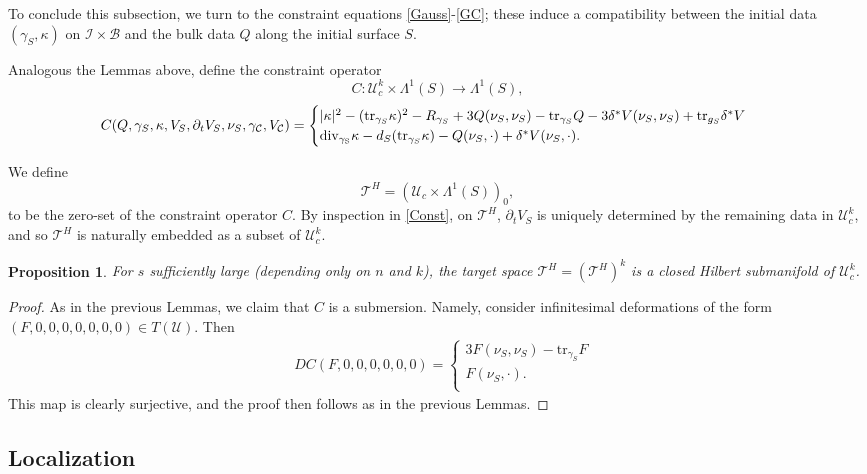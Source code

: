 \documentclass[10pt]{amsart}
\newcommand{\g}{\gamma}
\renewcommand{\d}{\delta}
\renewcommand{\k}{\kappa}
\newcommand{\cC}{{\mathcal C}}
\newcommand{\cT}{{\mathcal T}}
\newcommand{\cB}{{\mathcal B}}
\newcommand{\cU}{{\mathcal U}}
\newcommand{\cI}{\mathcal I}
\newcommand{\be}{\begin{equation}}
\newcommand{\ee}{\end{equation}}
\newcommand{\tr}{\mathrm{tr}}
\newcommand{\p}{\partial}
\renewcommand{\to}{\rightarrow}
\newcommand{\<}{\langle}
\renewcommand{\>}{\rangle}
\theoremstyle{plain}
\newtheorem{proposition}[lemma]{Proposition}
\theoremstyle{remark}
\theoremstyle{definition}
\numberwithin{equation}{section}
\begin{document}
  To conclude this subsection, we turn to the constraint equations \eqref{Gauss}-\eqref{GC}; these induce a compatibility between 
the initial data $(\g_S, \k)$ on $\cI \times \cB$ and the bulk data $Q$ along the initial surface $S$. 

  Analogous the Lemmas above, define the constraint operator 
 $$C: \cU_c^k \times \Lambda^1(S) \to \Lambda^1(S),$$
\be \label{Const}
\begin{split}
& C(Q, \g_S, \k, V_S, \p_t V_S, \nu_S, \g_{\cC}, V_{\cC}) = 
\begin{cases}
|\k|^2 - (\tr_{\g_S}\k)^2  - R_{\g_S} + 3Q(\nu_S,\nu_S) - \tr_{\g_S}Q - 3\d^*V(\nu_S, \nu_S) + \tr_{g_S}\d^*V\\
{\rm div_{\g_S}}  \k - d_S(\tr_{\g_S}\k) - Q(\nu_S, \cdot) + \d^*V(\nu_S, \cdot). \\
\end{cases}
\end{split}
\ee

  We define 
 \be \label{TH}
 \cT^H = (\cU_c \times \Lambda^1(S))_0,
 \ee
to be the zero-set of the constraint operator $C$. By inspection in \eqref{Const}, on $\cT^H$, $\p_t V_S$ is uniquely determined by the remaining 
data in $\cU_c^k$, and so $\cT^H$ is naturally embedded as a subset of $\cU_c^k$. 

\begin{proposition}\label{manifold}
For $s$ sufficiently large (depending only on $n$ and $k$), the target space $\cT^H = (\cT^H)^k$ is a closed Hilbert submanifold of $\cU_c^k$. 
\end{proposition}


\begin{proof} 
 As in the previous Lemmas, we claim that $C$ is a submersion. Namely, consider infinitesimal deformations of the 
form $(F, 0, 0, 0, 0, 0, 0, 0) \in T(\cU)$. Then 
\be 
\begin{split}
&DC(F, 0, 0, 0, 0, 0, 0) = 
\begin{cases}
3F(\nu_S,\nu_S) - \tr_{\g_S}F \\
F(\nu_S, \cdot). \\
\end{cases}
\end{split}
\ee
This map is clearly surjective, and the proof then follows as in the previous Lemmas. 

\end{proof}


  \subsection{Localization} 
  
\end{document}
